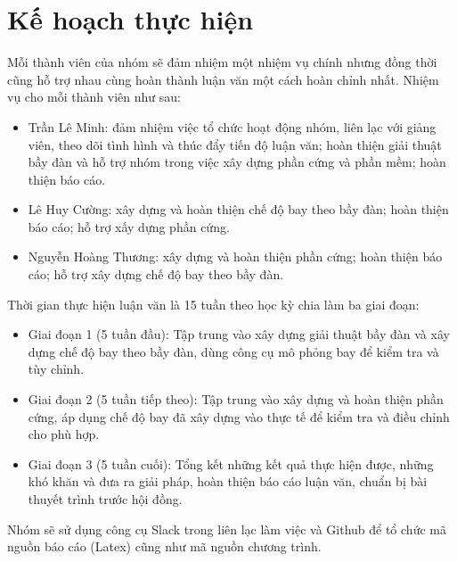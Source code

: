     \section{Kế hoạch thực hiện}
        Mỗi thành viên của nhóm sẽ đảm nhiệm một nhiệm vụ chính nhưng đồng thời cũng hỗ trợ nhau cùng hoàn thành luận văn một cách hoàn chỉnh nhất. Nhiệm vụ cho mỗi thành viên như sau:
        \begin{itemize}
        \item Trần Lê Minh: đảm nhiệm việc tổ chức hoạt động nhóm, liên lạc với giảng viên, theo dõi tình hình và thúc đẩy tiến độ luận văn; hoàn thiện giải thuật bầy đàn và hỗ trợ nhóm trong việc xây dựng phần cứng và phần mềm; hoàn thiện báo cáo.
        \item Lê Huy Cường: xây dựng và hoàn thiện chế độ bay theo bầy đàn; hoàn thiện báo cáo; hỗ trợ xấy dựng phần cứng.
        \item Nguyễn Hoàng Thương: xây dựng và hoàn thiện phần cứng; hoàn thiện báo cáo; hỗ trợ xây dựng chế độ bay theo bầy đàn. 
    \end{itemize}
    Thời gian thực hiện luận văn là 15 tuần theo học kỳ chia làm ba giai đoạn:
    \begin{itemize}
        \item Giai đoạn 1 (5 tuần đầu): Tập trung vào xây dựng giải thuật bầy đàn và xây dựng chế độ bay theo bầy đàn, dùng công cụ mô phỏng bay để kiểm tra và tùy chỉnh.
        \item Giai đoạn 2 (5 tuần tiếp theo): Tập trung vào xây dựng và hoàn thiện phần cứng, áp dụng chế độ bay đã xây dựng vào thực tế để kiểm tra và điều chỉnh cho phù hợp.
        \item Giai đoạn 3 (5 tuần cuối): Tổng kết những kết quả thực hiện được, những khó khăn và đưa ra giải pháp, hoàn thiện báo cáo luận văn, chuẩn bị bài thuyết trình trước hội đồng.
    \end{itemize}
    	Nhóm sẽ sử dụng công cụ Slack trong liên lạc làm việc và Github để tổ chức mã nguồn báo cáo (Latex) cũng như mã nguồn chương trình.
